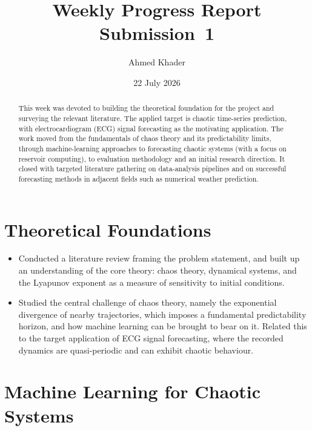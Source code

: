\documentclass[11pt,a4paper]{article}
\title{\textbf{Weekly Progress Report}\\[0.3em]
\large Submission~1}
\author{Ahmed Khader}
\date{22 July 2026}
\begin{document}
\maketitle

\begin{abstract}
\noindent This week was devoted to building the theoretical foundation for the
project and surveying the relevant literature. The applied target is chaotic
time-series prediction, with electrocardiogram (ECG) signal forecasting as the
motivating application. The work moved from the fundamentals of chaos theory
and its predictability limits, through machine-learning approaches to
forecasting chaotic systems (with a focus on reservoir computing), to
evaluation methodology and an initial research direction. It closed with
targeted literature gathering on data-analysis pipelines and on successful
forecasting methods in adjacent fields such as numerical weather prediction.
\end{abstract}

\section{Theoretical Foundations}

\begin{itemize}
  \item Conducted a literature review framing the problem statement, and built
        up an understanding of the core theory: chaos theory, dynamical
        systems, and the Lyapunov exponent as a measure of sensitivity to
        initial conditions.
  \item Studied the central challenge of chaos theory, namely the exponential
        divergence of nearby trajectories, which imposes a fundamental
        predictability horizon, and how machine learning can be brought to
        bear on it. Related this to the target application of ECG signal
        forecasting, where the recorded dynamics are quasi-periodic and can
        exhibit chaotic behaviour.
\end{itemize}

\section{Machine Learning for Chaotic Systems}
\end{document}
